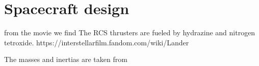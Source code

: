 \section{Spacecraft design}
from the movie we find 
The RCS thrusters are fueled by hydrazine and nitrogen tetroxide. 
https://interstellarfilm.fandom.com/wiki/Lander

The masses and inertias are taken from \cite{Girija2016}